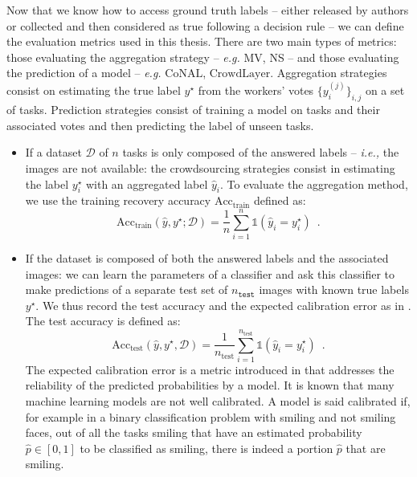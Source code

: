 Now that we know how to access ground truth labels -- either released by authors or collected and then considered as true following a decision rule -- we can define the evaluation metrics used in this thesis.
There are two main types of metrics: those evaluating the aggregation strategy -- \emph{e.g.} MV, NS -- and those evaluating the prediction of a model -- \emph{e.g.} $\mathrm{CoNAL}$, $\mathrm{CrowdLayer}$.
Aggregation strategies consist on estimating the true label $y^\star$ from the workers' votes $\{y_i^{(j)}\}_{i,j}$ on a set of tasks.
Prediction strategies consist of training a model on tasks and their associated votes and then predicting the label of unseen tasks.

\begin{itemize}
    \item If a dataset $\mathcal{D}$ of $n$ tasks is only composed of the answered labels -- \emph{i.e.,} the images are not available: the crowdsourcing strategies consist in estimating the label $y^\star_i$ with an aggregated label $\hat y_i$. To evaluate the aggregation method, we use the training recovery accuracy $\mathrm{Acc}_{\text{train}}$ defined as:
    \begin{equation}\label{eq:acctrain}
        \mathrm{Acc}_{\text{train}}(\hat y, y^\star; \mathcal{D}) = \frac{1}{n} \sum_{i=1}^{n} \mathds{1}(\hat y_i = y^\star_i)\enspace.
    \end{equation}
    \item If the dataset is composed of both the answered labels and the associated images: we can learn the parameters of a classifier and ask this classifier to make predictions of a separate test set of $n_\texttt{test}$ images with known true labels $y^\star$. We thus record the test accuracy and the expected calibration error as in \citet{guo_calibration_2017}. The test accuracy is defined as:
        \begin{equation}\label{eq:acctest}
        \mathrm{Acc}_{\text{test}}(\hat y, y^\star,\mathcal{D}) = \frac{1}{n_{\text{test}}}\sum_{i=1}^{n_\text{test}} \mathds{1}(\hat y_i = y^\star_i)\enspace.
    \end{equation}
    The expected calibration error is a metric introduced in \citet{naeini2015obtaining} that addresses the reliability of the predicted probabilities by a model.
    It is known that many machine learning models \citep{guo_calibration_2017} are not well calibrated.
    A model is said calibrated if, for example in a binary classification problem with smiling and not smiling faces, out of all the tasks smiling that have an estimated probability $\hat p\in [0,1]$ to be classified as smiling, there is indeed a portion $\hat p$ that are smiling.

\end{itemize}
